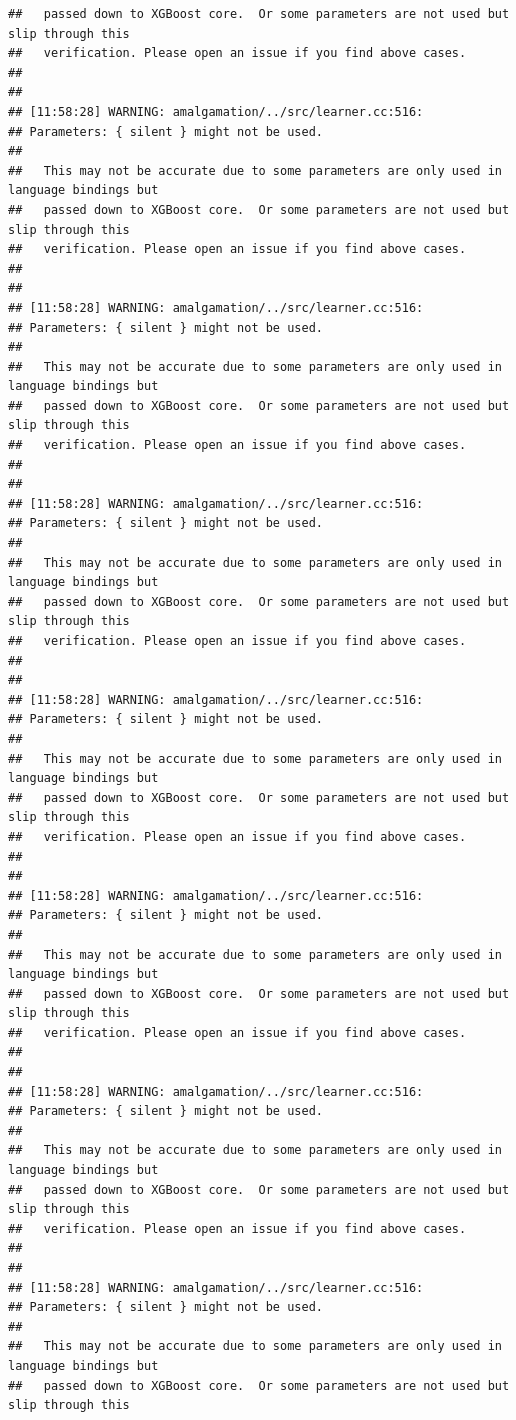 \documentclass[AMS,STIX2COL]{WileyNJD-v2}\usepackage[]{graphicx}\usepackage[]{color}
\makeatletter
\newenvironment{kframe}{%
 \def\at@end@of@kframe{}%
 \ifinner\ifhmode%
  \def\at@end@of@kframe{\end{minipage}}%
  \begin{minipage}{\columnwidth}%
 \fi\fi%
 \def\FrameCommand##1{\hskip\@totalleftmargin \hskip-\fboxsep
 \colorbox{shadecolor}{##1}\hskip-\fboxsep
     \hskip-\linewidth \hskip-\@totalleftmargin \hskip\columnwidth}%
 \MakeFramed {\advance\hsize-\width
   \@totalleftmargin\z@ \linewidth\hsize
   \@setminipage}}%
 {\par\unskip\endMakeFramed%
 \at@end@of@kframe}
\newenvironment{knitrout}{}{} %
\makeatother
\begin{document}
\begin{knitrout}
\begin{kframe}
\begin{verbatim}
##   passed down to XGBoost core.  Or some parameters are not used but slip through this
##   verification. Please open an issue if you find above cases.
## 
## 
## [11:58:28] WARNING: amalgamation/../src/learner.cc:516: 
## Parameters: { silent } might not be used.
## 
##   This may not be accurate due to some parameters are only used in language bindings but
##   passed down to XGBoost core.  Or some parameters are not used but slip through this
##   verification. Please open an issue if you find above cases.
## 
## 
## [11:58:28] WARNING: amalgamation/../src/learner.cc:516: 
## Parameters: { silent } might not be used.
## 
##   This may not be accurate due to some parameters are only used in language bindings but
##   passed down to XGBoost core.  Or some parameters are not used but slip through this
##   verification. Please open an issue if you find above cases.
## 
## 
## [11:58:28] WARNING: amalgamation/../src/learner.cc:516: 
## Parameters: { silent } might not be used.
## 
##   This may not be accurate due to some parameters are only used in language bindings but
##   passed down to XGBoost core.  Or some parameters are not used but slip through this
##   verification. Please open an issue if you find above cases.
## 
## 
## [11:58:28] WARNING: amalgamation/../src/learner.cc:516: 
## Parameters: { silent } might not be used.
## 
##   This may not be accurate due to some parameters are only used in language bindings but
##   passed down to XGBoost core.  Or some parameters are not used but slip through this
##   verification. Please open an issue if you find above cases.
## 
## 
## [11:58:28] WARNING: amalgamation/../src/learner.cc:516: 
## Parameters: { silent } might not be used.
## 
##   This may not be accurate due to some parameters are only used in language bindings but
##   passed down to XGBoost core.  Or some parameters are not used but slip through this
##   verification. Please open an issue if you find above cases.
## 
## 
## [11:58:28] WARNING: amalgamation/../src/learner.cc:516: 
## Parameters: { silent } might not be used.
## 
##   This may not be accurate due to some parameters are only used in language bindings but
##   passed down to XGBoost core.  Or some parameters are not used but slip through this
##   verification. Please open an issue if you find above cases.
## 
## 
## [11:58:28] WARNING: amalgamation/../src/learner.cc:516: 
## Parameters: { silent } might not be used.
## 
##   This may not be accurate due to some parameters are only used in language bindings but
##   passed down to XGBoost core.  Or some parameters are not used but slip through this

\end{verbatim}
\end{kframe}
\end{knitrout}
\end{document}
